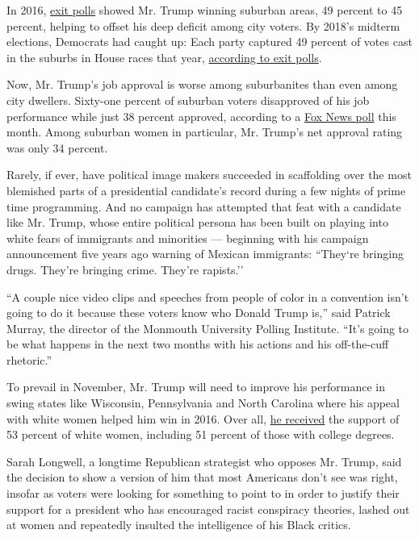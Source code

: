 In 2016,
\href{https://www.cnn.com/election/2016/results/exit-polls}{exit polls}
showed Mr. Trump winning suburban areas, 49 percent to 45 percent,
helping to offset his deep deficit among city voters. By 2018's midterm
elections, Democrats had caught up: Each party captured 49 percent of
votes cast in the suburbs in House races that year,
\href{https://www.cnn.com/election/2018/exit-polls}{according to exit
polls}.

Now, Mr. Trump's job approval is worse among suburbanites than even
among city dwellers. Sixty-one percent of suburban voters disapproved of
his job performance while just 38 percent approved, according to a
\href{https://static.foxnews.com/foxnews.com/content/uploads/2020/08/Fox_August-9-12-2020_Complete_National_Topline_August-13-Release.pdf}{Fox
News poll} this month. Among suburban women in particular, Mr. Trump's
net approval rating was only 34 percent.

Rarely, if ever, have political image makers succeeded in scaffolding
over the most blemished parts of a presidential candidate's record
during a few nights of prime time programming. And no campaign has
attempted that feat with a candidate like Mr. Trump, whose entire
political persona has been built on playing into white fears of
immigrants and minorities --- beginning with his campaign announcement
five years ago warning of Mexican immigrants: ``They`re bringing drugs.
They're bringing crime. They're rapists.''

``A couple nice video clips and speeches from people of color in a
convention isn't going to do it because these voters know who Donald
Trump is,'' said Patrick Murray, the director of the Monmouth University
Polling Institute. ``It's going to be what happens in the next two
months with his actions and his off-the-cuff rhetoric.''

To prevail in November, Mr. Trump will need to improve his performance
in swing states like Wisconsin, Pennsylvania and North Carolina where
his appeal with white women helped him win in 2016. Over all,
\href{https://www.nytimes3xbfgragh.onion/2016/12/01/us/politics/white-women-helped-elect-donald-trump.html}{he
received} the support of 53 percent of white women, including 51 percent
of those with college degrees.

Sarah Longwell, a longtime Republican strategist who opposes Mr. Trump,
said the decision to show a version of him that most Americans don't see
was right, insofar as voters were looking for something to point to in
order to justify their support for a president who has encouraged racist
conspiracy theories, lashed out at women and repeatedly insulted the
intelligence of his Black critics.

